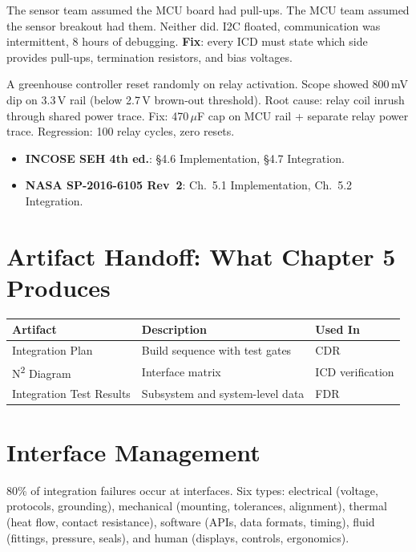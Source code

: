 \documentclass[11pt,letterpaper,twoside,openany]{book}
\begin{document}
\begin{greenshieldbox}
The sensor team assumed the MCU board had pull-ups. The MCU team assumed the sensor breakout had them. Neither did. I2C floated, communication was intermittent, 8 hours of debugging. \textbf{Fix}: every ICD must state which side provides pull-ups, termination resistors, and bias voltages.
\end{greenshieldbox}

\begin{tipbox}
A greenhouse controller reset randomly on relay activation. Scope showed 800\,mV dip on 3.3\,V rail (below 2.7\,V brown-out threshold). Root cause: relay coil inrush through shared power trace. Fix: 470\,$\mu$F cap on MCU rail + separate relay power trace. Regression: 100 relay cycles, zero resets.
\end{tipbox}

\begin{keyconceptbox}
\begin{itemize}[nosep,leftmargin=1.5em]
\item \textbf{INCOSE SEH 4th ed.}: \S4.6 Implementation, \S4.7 Integration.
\item \textbf{NASA SP-2016-6105 Rev~2}: Ch.~5.1 Implementation, Ch.~5.2 Integration.
\end{itemize}
\end{keyconceptbox}

\section{Artifact Handoff: What Chapter 5 Produces}
\begin{table}[htbp]\centering\small
\begin{tabularx}{\textwidth}{l X l}
\toprule
\textbf{Artifact} & \textbf{Description} & \textbf{Used In} \\
\midrule
Integration Plan & Build sequence with test gates & CDR \\
N\textsuperscript{2} Diagram & Interface matrix & ICD verification \\
Integration Test Results & Subsystem and system-level data & FDR \\
\bottomrule
\end{tabularx}
\end{table}

\section{Interface Management}
80\% of integration failures occur at interfaces. Six types: electrical (voltage, protocols, grounding), mechanical (mounting, tolerances, alignment), thermal (heat flow, contact resistance), software (APIs, data formats, timing), fluid (fittings, pressure, seals), and human (displays, controls, ergonomics).
\end{document}
